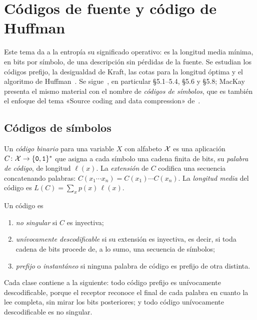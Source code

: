 \chapter{Códigos de fuente y código de Huffman}
\label{tema:3}

Este tema da a la entropía su significado operativo: es la longitud media mínima, en bits por símbolo, de una descripción sin pérdidas de la fuente. Se estudian los códigos prefijo, la desigualdad de Kraft, las cotas para la longitud óptima y el algoritmo de Huffman~\cite{huffman}. Se sigue~\cite[cap.~5]{ct}, en particular §5.1--5.4, §5.6 y §5.8; MacKay~\cite[cap.~5]{mackay} presenta el mismo material con el nombre de \emph{códigos de símbolos}, que es también el enfoque del tema «Source coding and data compression» de~\cite{camit}.

\section{Códigos de símbolos}

\begin{definicion}[Código]\label{def:codigo}
Un \emph{código binario} para una variable $X$ con alfabeto $\mathcal{X}$ es una aplicación $C\colon\mathcal{X}\to\{\textnormal{\texttt{0}},\textnormal{\texttt{1}}\}^{*}$ que asigna a cada símbolo una cadena finita de bits, su \emph{palabra de código}, de longitud $\ell(x)$. La \emph{extensión} de $C$ codifica una secuencia concatenando palabras: $C(x_1\cdots x_n)=C(x_1)\cdots C(x_n)$. La \emph{longitud media} del código es $L(C)=\sum_{x}p(x)\,\ell(x)$.
\end{definicion}

\begin{definicion}\label{def:clases}
Un código es
\begin{enumerate}
  \item \emph{no singular} si $C$ es inyectiva;
  \item \emph{unívocamente descodificable} si su extensión es inyectiva, es decir, si toda cadena de bits procede de, a lo sumo, una secuencia de símbolos;
  \item \emph{prefijo} o \emph{instantáneo} si ninguna palabra de código es prefijo de otra distinta.
\end{enumerate}
\end{definicion}

Cada clase contiene a la siguiente: todo código prefijo es unívocamente descodificable, porque el receptor reconoce el final de cada palabra en cuanto la lee completa, sin mirar los bits posteriores; y todo código unívocamente descodificable es no singular.

